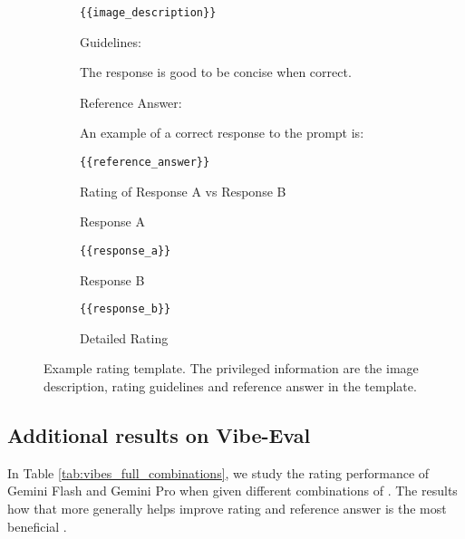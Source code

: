 \begin{figure}[h]
\begin{subfigure}{\linewidth}
\begin{tcolorbox}[colback=blue!5!white,colframe=mybrown!75!black]
\begin{scriptsize}
\texttt{\{\{image\_description\}\}}

{\small Guidelines:}

The response is good to be concise when correct.

{\small Reference Answer:}

An example of a correct response to the prompt is:

\texttt{\{\{reference\_answer\}\}}

{\small Rating of Response A vs Response B}

Response A

\texttt{\{\{response\_a\}\}}

Response B

\texttt{\{\{response\_b\}\}}

Detailed Rating
\end{scriptsize}
\end{tcolorbox}
\end{subfigure}\hfill
\caption{Example \VibeEval rating template. The privileged information are the image description, rating guidelines and reference answer in the template.}
\label{fig:vibe_eval_template}
\end{figure}

\subsection{Additional results on Vibe-Eval}
In Table \ref{tab:vibes_full_combinations}, we study the rating performance of Gemini Flash and Gemini Pro when given different combinations of \PI. The results how that more \PI generally helps improve rating and reference answer is the most beneficial \PI.

